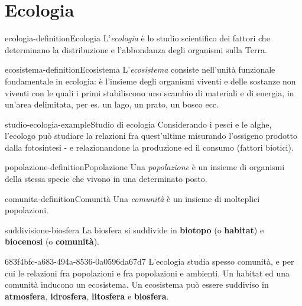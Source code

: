 \documentclass[preview]{standalone}
\begin{document}
\genpage

\section{Ecologia}

\begin{snippetdefinition}{ecologia-definition}{Ecologia}
    L'\textit{ecologia} è lo studio scientifico dei fattori che determinano la
    distribuzione e l'abbondanza degli organismi sulla Terra.
\end{snippetdefinition}

\begin{snippetdefinition}{ecosistema-definition}{Ecosistema}
    L'\textit{ecosistema} consiste nell'unità funzionale fondamentale in ecologia: è
    l'insieme degli organismi viventi e delle sostanze non viventi
    con le quali i primi stabiliscono uno scambio di materiali e di
    energia, in un'area delimitata, per es. un lago, un prato, un
    bosco ecc.
\end{snippetdefinition}


\begin{snippetexample}{studio-ecologia-example}{Studio di ecologia}
    Considerando i pesci e le alghe, l'ecologo può studiare la relazioni fra
    quest'ultime misurando l'ossigeno prodotto dalla fotosintesi - e relazionandone
    la produzione ed il consumo (fattori biotici).
\end{snippetexample}

\begin{snippetdefinition}{popolazione-definition}{Popolazione}
    Una \textit{popolazione} è un insieme di organismi della stessa
    specie che vivono in una determinato posto.
\end{snippetdefinition}

\begin{snippetdefinition}{comunita-definition}{Comunità}
    Una \textit{comunità} è un insieme di molteplici popolazioni.
\end{snippetdefinition}


\begin{snippet}{suddivisione-biosfera}
    La biosfera si suddivide in \textbf{biotopo} (o \textbf{habitat}) e \textbf{biocenosi} (o \textbf{comunità}).
\end{snippet}

\begin{snippet}{683f4bfc-a683-494a-8536-0a0596da67d7}
    L'ecologia studia spesso comunità, e per cui le relazioni fra popolazioni e fra popolazioni
    e ambienti. Un habitat ed una comunità inducono un ecosistema.
    Un ecosistema può essere suddiviso in \textbf{atmosfera}, \textbf{idrosfera}, \textbf{litosfera}
    e \textbf{biosfera}.
\end{snippet}
\end{document}

